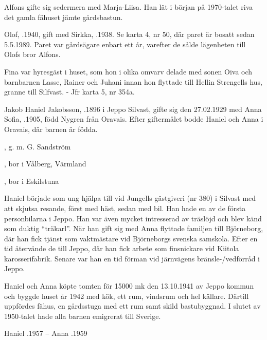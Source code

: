 Alfons gifte sig sedermera med Marja-Liisa. Han lät i början på 1970-talet riva det gamla fähuset jämte gårdsbastun.


Olof, .1940, gift med Sirkka, .1938. Se karta 4, nr 50, där paret är bosatt sedan 5.5.1989. Paret var gårdsägare enbart ett år, varefter de sålde lägenheten till Olofs bror Alfons.


Fina var hyresgäst i huset, som hon i olika omvarv delade med sonen Oiva och barnbarnen Lasse, Rainer och Juhani innan hon flyttade till Hellin Strengells hus, granne till Silfvast. - Jfr karta 5, nr 354a.


Jakob Haniel Jakobsson, .1896 i Jeppo Silvast, gifte sig den 27.02.1929 med Anna Sofia, .1905, född Nygren från Oravais. Efter giftermålet bodde Haniel och Anna i Oravais, där barnen är födda.
\begin{jhchildren}
  \item {}, g. m. G. Sandström
  \item {}
  \item {}, bor i Vålberg, Värmland
  \item {}, bor i Eskilstuna
\end{jhchildren}
Haniel började som ung hjälpa till vid Jungells gästgiveri (nr 380) i Silvast med att skjutsa resande, först med häst, sedan med bil. Han hade en av de första personbilarna i Jeppo. Han var även mycket intresserad av träslöjd och blev känd som duktig ``träkarl''. När han gift sig med Anna flyttade familjen till Björneborg, där han fick tjänst som vaktmästare vid Björneborgs svenska samskola. Efter en tid återvände de till Jeppo, där han fick arbete som finsnickare vid Kiitola karosserifabrik. Senare var han en tid förman vid järnvägens bränsle-/vedförråd i Jeppo.

Haniel och Anna köpte tomten för 15000 mk den 13.10.1941 av Jeppo kommun och byggde huset år 1942 med kök, ett rum, vindsrum och hel källare. Därtill uppfördes fähus, en gårdsstuga med ett rum samt skild bastubyggnad. I slutet av 1950-talet hade alla barnen emigrerat till Sverige.

Haniel .1957  --  Anna .1959



